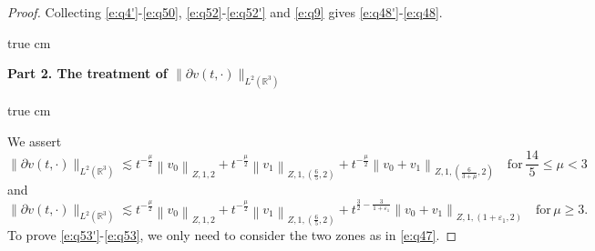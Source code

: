 \documentclass[11pt,twoside]{article}
\newcommand{\R}{\mathbb R}
\newcommand{\p}{\partial}
\newcommand{\f}{\frac}
\theoremstyle{plain}
\theoremstyle{definition}
\theoremstyle{remark}
\numberwithin{equation}{section}
\begin{document}
\begin{proof}
Collecting \eqref{e:q4'}-\eqref{e:q50}, \eqref{e:q52}-\eqref{e:q52'} and \eqref{e:q9}  gives \eqref{e:q48'}-\eqref{e:q48}.

 true cm

{\bf Part 2.  The treatment  of $\|\p v(t, \cdot)\|_{L^2(\R^3)}$ }

 true cm

We assert
\begin{equation}\label{e:q53'}
\|\p v(t, \cdot)\|_{L^2(\R^3)} \lesssim t^{-\f{\mu}{2}}\left\|v_0\right\|_{Z, 1, 2}+t^{-\f{\mu}{2}}\left\|v_1\right\|_{Z, 1,(\f65, 2)}+t^{-\f{\mu}{2}}\left\|v_0+v_1\right\|_{Z, 1,(\f{6}{3+\mu}, 2)}\quad \text{for}\, \f{14}{5}\leq\mu<3
\end{equation}
and
\begin{equation}\label{e:q53}
\|\p v(t, \cdot)\|_{L^2(\R^3)} \lesssim t^{-\f{\mu}{2}}\left\|v_0\right\|_{Z, 1, 2}+t^{-\f{\mu}{2}}\left\|v_1\right\|_{Z, 1,(\f65, 2)}+t^{\f32-\f{3}{1+\varepsilon_1}}\left\|v_0+v_1\right\|_{Z, 1,(1+\varepsilon_1, 2)}\quad \text{for}\, \mu\geq3.
\end{equation}
To prove \eqref{e:q53'}-\eqref{e:q53}, we only need to consider  the two zones as in \eqref{e:q47}.



\end{proof}
\end{document}
